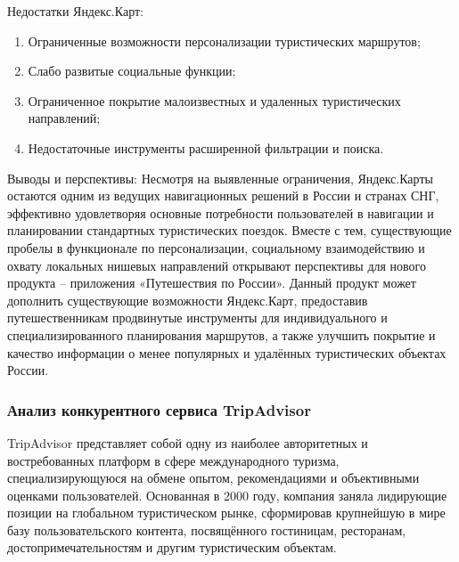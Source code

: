 Недостатки Яндекс.Карт:
\begin{enumerate}
    \item Ограниченные возможности персонализации туристических маршрутов;
    \item Слабо развитые социальные функции;
    \item Ограниченное покрытие малоизвестных и удаленных туристических направлений;
    \item Недостаточные инструменты расширенной фильтрации и поиска.
\end{enumerate}

Выводы и перспективы:
Несмотря на выявленные ограничения, Яндекс.Карты остаются одним из ведущих навигационных решений в России и странах СНГ, эффективно удовлетворяя основные потребности пользователей в навигации и планировании стандартных туристических поездок. Вместе с тем, существующие пробелы в функционале по персонализации, социальному взаимодействию и охвату локальных нишевых направлений открывают перспективы для нового продукта – приложения «Путешествия по России». Данный продукт может дополнить существующие возможности Яндекс.Карт, предоставив путешественникам продвинутые инструменты для индивидуального и специализированного планирования маршрутов, а также улучшить покрытие и качество информации о менее популярных и удалённых туристических объектах России.

\subsubsection*{Анализ конкурентного сервиса TripAdvisor}
TripAdvisor представляет собой одну из наиболее авторитетных и востребованных платформ в сфере международного туризма, специализирующуюся на обмене опытом, рекомендациями и объективными оценками пользователей. Основанная в 2000 году, компания заняла лидирующие позиции на глобальном туристическом рынке, сформировав крупнейшую в мире базу пользовательского контента, посвящённого гостиницам, ресторанам, достопримечательностям и другим туристическим объектам.

